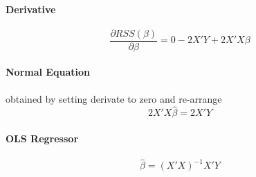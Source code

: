 \documentclass[11pt]{article}
\begin{document}
\paragraph{Derivative}
\begin{equation*}
    \frac{\partial RSS(\beta)}{\partial \beta} = 0 - 2X'Y + 2X'X\beta
\end{equation*}
\paragraph{Normal Equation} obtained by setting derivate to zero and re-arrange
\begin{equation*}
    2X'X\hat{\beta} = 2X'Y
\end{equation*}
\paragraph{OLS Regressor}
\begin{equation*}
    \hat{\beta} = (X'X)^{-1}X'Y
\end{equation*}
\end{document}
